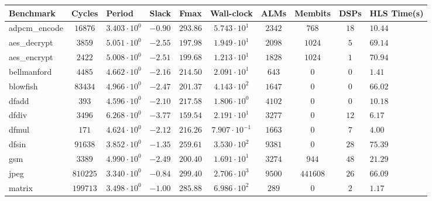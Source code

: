 \begin{tabular}{|l|c|HHc|c|c|c|cH|}
\hline
Benchmark     & Cycles       & Period                 & Slack     & Fmax       & Wall-clock              & ALMs      & Membits    & DSPs    & HLS Time(s) \\
\hline
adpcm\_encode & $ 16876    $ & $ 3.403 \cdot 10^{0} $ & $ -0.90 $ & $ 293.86 $ & $ 5.743 \cdot 10^{1}  $ & $ 2342  $ & $ 768    $ & $ 18  $ & $ 10.44   $ \\
aes\_decrypt  & $ 3859     $ & $ 5.051 \cdot 10^{0} $ & $ -2.55 $ & $ 197.98 $ & $ 1.949 \cdot 10^{1}  $ & $ 2098  $ & $ 1024   $ & $ 5   $ & $ 69.14   $ \\
aes\_encrypt  & $ 2422     $ & $ 5.008 \cdot 10^{0} $ & $ -2.51 $ & $ 199.68 $ & $ 1.213 \cdot 10^{1}  $ & $ 1828  $ & $ 1024   $ & $ 1   $ & $ 70.94   $ \\
bellmanford   & $ 4485     $ & $ 4.662 \cdot 10^{0} $ & $ -2.16 $ & $ 214.50 $ & $ 2.091 \cdot 10^{1}  $ & $ 643   $ & $ 0      $ & $ 0   $ & $ 1.41    $ \\
blowfish      & $ 83434    $ & $ 4.966 \cdot 10^{0} $ & $ -2.47 $ & $ 201.37 $ & $ 4.143 \cdot 10^{2}  $ & $ 1647  $ & $ 0      $ & $ 0   $ & $ 66.02   $ \\
dfadd         & $ 393      $ & $ 4.596 \cdot 10^{0} $ & $ -2.10 $ & $ 217.58 $ & $ 1.806 \cdot 10^{0}  $ & $ 4102  $ & $ 0      $ & $ 0   $ & $ 10.18   $ \\
dfdiv         & $ 3496     $ & $ 6.268 \cdot 10^{0} $ & $ -3.77 $ & $ 159.54 $ & $ 2.191 \cdot 10^{1}  $ & $ 3277  $ & $ 0      $ & $ 12  $ & $ 6.17    $ \\
dfmul         & $ 171      $ & $ 4.624 \cdot 10^{0} $ & $ -2.12 $ & $ 216.26 $ & $ 7.907 \cdot 10^{-1} $ & $ 1663  $ & $ 0      $ & $ 7   $ & $ 4.00    $ \\
dfsin         & $ 91638    $ & $ 3.852 \cdot 10^{0} $ & $ -1.35 $ & $ 259.61 $ & $ 3.530 \cdot 10^{2}  $ & $ 9381  $ & $ 0      $ & $ 28  $ & $ 75.39   $ \\
gsm           & $ 3389     $ & $ 4.990 \cdot 10^{0} $ & $ -2.49 $ & $ 200.40 $ & $ 1.691 \cdot 10^{1}  $ & $ 3274  $ & $ 944    $ & $ 48  $ & $ 21.29   $ \\
jpeg          & $ 810225   $ & $ 3.340 \cdot 10^{0} $ & $ -0.84 $ & $ 299.40 $ & $ 2.706 \cdot 10^{3}  $ & $ 9500  $ & $ 441608 $ & $ 26  $ & $ 66.09   $ \\
matrix        & $ 199713   $ & $ 3.498 \cdot 10^{0} $ & $ -1.00 $ & $ 285.88 $ & $ 6.986 \cdot 10^{2}  $ & $ 289   $ & $ 0      $ & $ 2   $ & $ 1.17    $ \\

\end{tabular}
